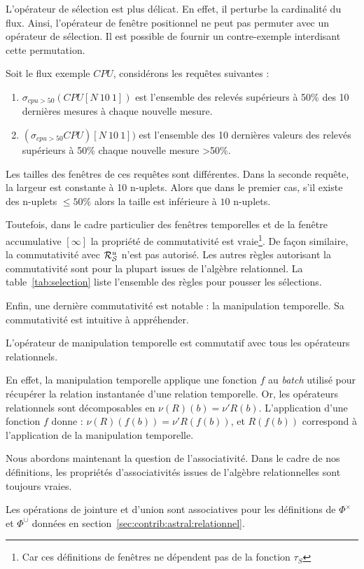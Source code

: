 L'opérateur de sélection est plus délicat. En effet, il perturbe la cardinalité du flux. Ainsi, l'opérateur de fenêtre positionnel ne peut pas permuter avec un opérateur de sélection. Il est possible de fournir un contre-exemple interdisant cette permutation.
\begin{example}
Soit le flux exemple $CPU$, considérons les requêtes suivantes :
\begin{enumerate}
	\item $\sigma_{cpu>50} (CPU[N\ 10\ 1])$ est l'ensemble des relevés supérieurs à 50\% des 10 dernières mesures à chaque nouvelle mesure.
	\item $(\sigma_{cpu>50} CPU)[N\ 10\ 1])$ est l'ensemble des 10 dernières valeurs des relevés supérieurs à 50\% chaque nouvelle mesure >50\%.
\end{enumerate}
Les tailles des fenêtres de ces requêtes sont différentes. Dans la seconde requête, la largeur est constante à 10 n-uplets. Alors que dans le premier cas, s'il existe des n-uplets $\leq 50\%$ alors la taille est inférieure à $10$ n-uplets.
\end{example}
Toutefois, dans le cadre particulier des fenêtres temporelles et de la fenêtre accumulative $[\infty]$ la propriété de commutativité est vraie\footnote{Car ces définitions de fenêtres ne dépendent pas de la fonction $\tau_S$}. De façon similaire, la commutativité avec $\mathcal{R}_{\mathcal S}^{u}$ n'est pas autorisé. Les autres règles autorisant la commutativité sont pour la plupart issues de l'algèbre relationnel. La table~\ref{tab:selection} liste l'ensemble des règles pour pousser les sélections.

Enfin, une dernière commutativité est notable : la manipulation temporelle. Sa commutativité est intuitive à appréhender.
\begin{prop}\label{prop:commut:manipulation}
L'opérateur de manipulation temporelle est commutatif avec tous les opérateurs relationnels.
\end{prop}
En effet, la manipulation temporelle applique une fonction $f$ au \textit{batch} utilisé pour récupérer la relation instantanée d'une relation temporelle. Or, les opérateurs relationnels sont décomposables en $\nu (R)(b) = \nu' R(b)$. L'application d'une fonction $f$ donne : $\nu (R)(f(b)) = \nu' R(f(b))$, et $R(f(b))$ correspond à l'application de la manipulation temporelle.


Nous abordons maintenant la question de l'associativité. Dans le cadre de nos définitions, les propriétés d'associativités issues de l'algèbre relationnelles sont toujours vraies.
\begin{prop}
Les opérations de jointure et d'union sont associatives pour les définitions de $\Phi^\times$ et $\Phi^\cup$ données en section~\ref{sec:contrib:astral:relationnel}.
\end{prop}

